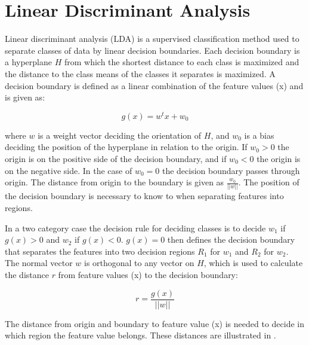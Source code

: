 \section{Linear Discriminant Analysis}

Linear discriminant analysis (LDA) is a supervised classification method used to separate classes of data by linear decision boundaries. Each decision boundary is a hyperplane $H$ from which the shortest distance to each class is maximized and the distance to the class means of the classes it separates is maximized. A decision boundary is defined as a linear combination of the feature values (x) and is given as: \cite{Duda2000}

\begin{equation}
g(x) = w^tx +w_0
\end{equation}

where $w$ is a weight vector deciding the orientation of $H$, and $w_0$ is a bias deciding the position of the hyperplane in relation to the origin. If $w_0 > 0$ the origin is on the positive side of the decision boundary, and if $w_0 < 0$ the origin is on the negative side. In the case of $w_0 = 0$ the decision boundary passes through origin. The distance from origin to the boundary is given as $\frac{w_0}{||w||}$. The position of the decision boundary is necessary to know to when separating features into regions. \cite{Duda2000}

In a two category case the decision rule for deciding classes is to decide $w_1$ if $g(x) > 0$ and $w_2$ if $g(x) < 0$. $g(x) = 0$ then defines the decision boundary that separates the features into two decision regions $R_1$ for $w_1$ and $R_2$ for $w_2$. The normal vector $w$ is orthogonal to any vector on $H$, which is used to calculate the distance $r$ from feature values (x) to the decision boundary: \cite{Duda2000}

\begin{equation} \label{eq:featureValueDistance}
r = \frac{g(x)}{||w||}
\end{equation} 

The distance from origin and boundary to feature value (x) is needed to decide in which region the feature value belongs. \cite{Duda2000} These distances are illustrated in .

